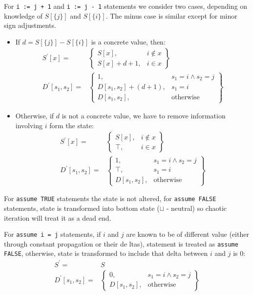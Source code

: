 For \texttt{i := j + 1} and \texttt{i := j - 1} statements we consider two cases, depending on knowledge of $S[\{j\}]$ and $S[\{i\}]$. The minus case is similar except for minor sign adjustments.
\begin{itemize}
\item If $d=S[\{j\}]-S[\{i\}]$ is a concrete value, then:
\begin{align*}
S^\prime[x] = & \left.
	\begin{cases}
		S[x], & i \notin x \\
		S[x] + d + 1, & i \in x
	\end{cases}
\right\}\\
D^\prime[s_1, s_2] = & \left.
	\begin{cases}
		1, & s_1 = i \wedge s_2 = j \\
		D[s_1,s_2] + (d + 1), & s_1 = i \\
		D[s_1,s_2], & \text{otherwise}
	\end{cases}
\right\}
\end{align*}
\item Otherwise, if $d$ is not a concrete value, we have to remove information involving $i$ form the state:
\begin{align*}
S^\prime[x] = & \left.
	\begin{cases}
		S[x], & i \notin x \\
		\top, & i \in x
	\end{cases}
\right\}\\
D^\prime[s_1, s_2] = & \left.
	\begin{cases}
		1, & s_1 = i \wedge s_2 = j \\
		\top, & s_1 = i \\
		D[s_1,s_2], & \text{otherwise}
	\end{cases}
\right\}
\end{align*}
\end{itemize}


For \texttt{assume TRUE} statements the state is not altered, for \texttt{assume FALSE} statements, state is transformed into bottom state ($\sqcup$ - neutral) so chaotic iteration will treat it as a dead end.

For \texttt{assume i = j} statements, if $i$ and $j$ are known to be of different value (either through constant propagation or their de ltas), statement is treated as \texttt{assume FALSE}, otherwise, state is transformed to include that delta between $i$ and $j$ is 0:
\begin{align*}
S^\prime = & S \\
D^\prime[s_1, s_2] = & \left.
	\begin{cases}
		0, & s_1 = i \wedge s_2 = j \\
		D[s_1,s_2], & \text{otherwise}
	\end{cases}
\right\}
\end{align*}

